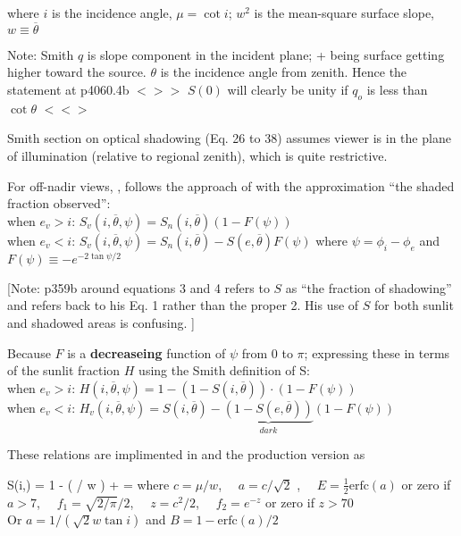 \documentclass{article}
\newcommand{\erfc}{\mathrm{erfc}}  %
\newcommand{\bq}{$ < \! > \!   \! >$ } %
\newcommand{\eq}{ $< \! \! < \! > $ } %
\begin{document}
where $i$ is the incidence angle, $\mu = \cot i $; $w^2$ is the mean-square
surface slope, $w \equiv \overline{\theta} $

Note: Smith $q$ is slope component in the incident plane; + being surface
getting higher toward the source. $\theta$ is the incidence angle from
zenith. Hence the statement at p4060.4b \bq $S(0)$ will clearly be unity if
$q_o$ is less than $\cot \theta$ \eq

Smith section on optical shadowing (Eq. 26 to 38) assumes viewer is in the plane
of illumination (relative to regional zenith), which is quite restrictive.

  For off-nadir views,  , follows the approach of  with the approximation ``the shaded fraction observed'':
\\ when $e_v>i$: $S_v(i,\overline{\theta},\psi)=S_n(i,\overline{\theta}) \left( 1-F(\psi) \right) $
\\ when $e_v<i$: $S_v(i,\overline{\theta},\psi)=S_n(i,\overline{\theta}) -S(e,\overline{\theta})F(\psi) $
\qi  where $\psi = \phi_i-\phi_e$  and $F(\psi) \equiv -e^{-2 \tan \psi/2} $

[Note:   p359b around equations 3 and 4 refers to $S$ as ``the fraction of shadowing'' and refers back to his Eq. 1 rather than the proper 2. His use of $S$  for both sunlit and shadowed areas is confusing. ]

Because $F$ is a \textbf{decreaseing} function of $\psi$  from 0 to $\pi$;
 expressing these in terms of the sunlit fraction $H$ using the Smith definition of S:
\\ when $e_v>i$: $H(i,\overline{\theta},\psi)= 1- \left( 1-S(i,\overline{\theta})  \right)\cdot \left( 1-F(\psi) \right) $
\\ when $e_v<i$: $H_v(i,\overline{\theta},\psi)=S(i,\overline{\theta}) -\underbrace{\left( 1-S(e,\overline{\theta}) \right)}_{dark} \left( 1-F(\psi) \right) $


These relations are implimented in  and the production version
 as

\qb S(i,\overline{\theta}) =  \frac{ 1- \frac{1}{2} \erfc \left( \mu / \sqrt{2} w \right) } 
{1  -  \erfc \left(  \mu /  w \right) 
+   }
=   
\qe
where $c=\mu/w$, \ \ $a=c/\sqrt{2}$ , \ \ $E= \frac{1}{2} \erfc \left( a \right)$ or zero if $a>7$, \ \  $f_1= \sqrt{2/\pi}/2 $, \ \ $z=c^2/2$, \ \ $f_2= e^{-z}$ or zero if $z > 70$
\\ Or $a=1/(\sqrt{2}w \tan i)$ and $B=1-\erfc(a)/2$
\end{document}
